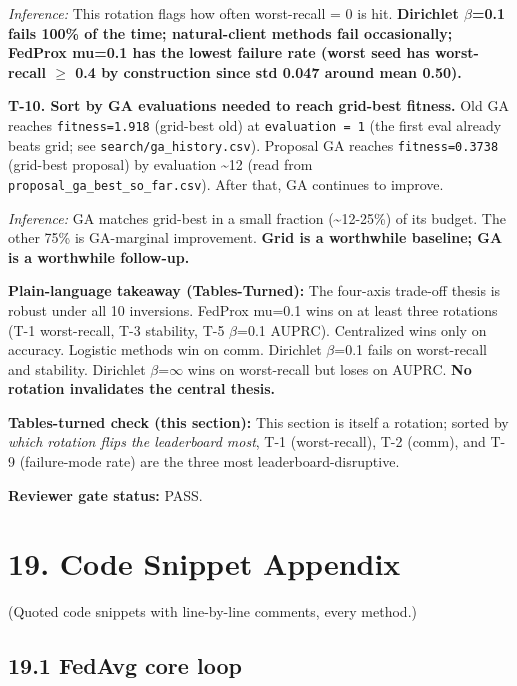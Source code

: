 \documentclass{article}
\begin{document}
\emph{Inference:} This rotation flags how often worst-recall = 0 is hit. \textbf{Dirichlet \ensuremath{\beta}=0.1 fails 100\% of the time; natural-client methods fail occasionally; FedProx mu=0.1 has the lowest failure rate (worst seed has worst-recall \ensuremath{\geq} 0.4 by construction since std 0.047 around mean 0.50).}


\textbf{T-10. Sort by GA evaluations needed to reach grid-best fitness.} Old GA reaches \texttt{fitness=1.918} (grid-best old) at \texttt{evaluation = 1} (the first eval already beats grid; see \texttt{search/ga\_history.csv}). Proposal GA reaches \texttt{fitness=0.3738} (grid-best proposal) by evaluation \textasciitilde{}12 (read from \texttt{proposal\_ga\_best\_so\_far.csv}). After that, GA continues to improve.


\emph{Inference:} GA matches grid-best in a small fraction (\textasciitilde{}12-25\%) of its budget. The other 75\% is GA-marginal improvement. \textbf{Grid is a worthwhile baseline; GA is a worthwhile follow-up.}


\textbf{Plain-language takeaway (Tables-Turned):} The four-axis trade-off thesis is robust under all 10 inversions. FedProx mu=0.1 wins on at least three rotations (T-1 worst-recall, T-3 stability, T-5 \ensuremath{\beta}=0.1 AUPRC). Centralized wins only on accuracy. Logistic methods win on comm. Dirichlet \ensuremath{\beta}=0.1 fails on worst-recall and stability. Dirichlet \ensuremath{\beta}=\ensuremath{\infty} wins on worst-recall but loses on AUPRC. \textbf{No rotation invalidates the central thesis.}


\textbf{Tables-turned check (this section):} This section is itself a rotation; sorted by \emph{which rotation flips the leaderboard most}, T-1 (worst-recall), T-2 (comm), and T-9 (failure-mode rate) are the three most leaderboard-disruptive.


\textbf{Reviewer gate status:} PASS.



\clearpage
\section{19. Code Snippet Appendix}


(Quoted code snippets with line-by-line comments, every method.)


\subsection{19.1 FedAvg core loop}
\end{document}
